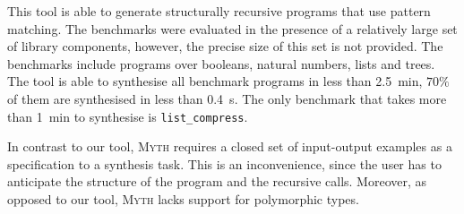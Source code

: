 This tool is able to generate structurally recursive programs that use pattern matching. The benchmarks were evaluated in the presence of a relatively large set of library components, however, the precise size of this set is not provided. The benchmarks include programs over booleans, natural numbers, lists and trees. The tool is able to synthesise all benchmark programs in less than \SI{2.5}{min}, $70\%$ of them are synthesised in less than \SI{0.4}{s}. The only benchmark that takes more than \SI{1}{min} to synthesise is \lstinline!list_compress!.

In contrast to our tool, \textsc{Myth} requires a closed set of input-output examples as a specification to a synthesis task. This is an inconvenience, since the user has to anticipate the structure of the program and the recursive calls. Moreover, as opposed to our tool, \textsc{Myth} lacks support for polymorphic types.

%



